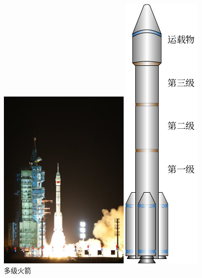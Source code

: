 \begin{figure}[htbp]
    \centering
    \begin{minipage}[t]{0.48\textwidth}
        \centering
        \includegraphics[width=6.5cm]{fig/A/8-9.png}
        \caption{}\label{fig_A_8-9}
    \end{minipage}
    \hfil
    \begin{minipage}[t]{0.48\textwidth}
        \centering
        \includegraphics{fig/A/8-10.pdf}
        \caption{多级火箭}\label{fig_A_8-10}
\end{minipage}
\end{figure}



